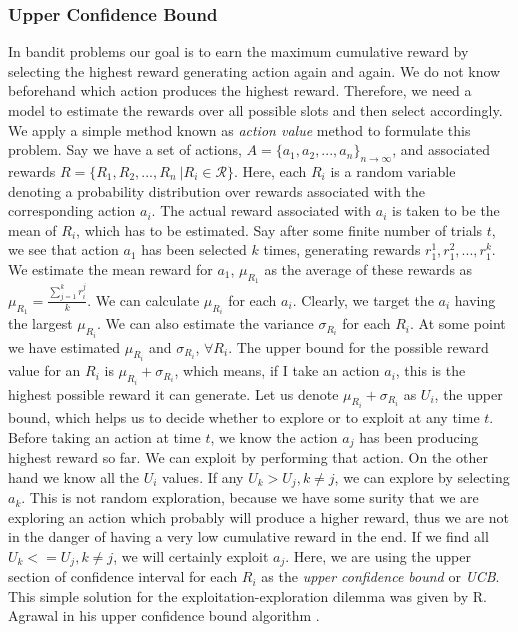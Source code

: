 \documentclass[english]{tktltiki}
\begin{document}
\subsubsection{Upper Confidence Bound}
\label{sec:UCB}
In bandit problems our goal is to earn the maximum cumulative reward by selecting the highest reward generating action again and again. We do not know beforehand which action produces the highest reward. Therefore, we need a model to estimate the rewards over all possible slots and then select accordingly. We apply a simple method known as \textit{action value} method \cite{reinforcement_learning} to formulate this problem. Say we have a set of actions, $A = \{a_1, a_2, ..., a_n\}_{n \to \infty}$, and associated rewards $R = \{R_1, R_2, ..., R_n\ | R_i \in \mathcal{R}\}$. Here, each $R_i$ is a random variable denoting a probability distribution over rewards associated with the corresponding action $a_i$. The actual reward associated with $a_i$ is taken to be the mean of $R_i$, which has to be estimated. Say after some finite number of trials $t$, we see that action $a_1$ has been selected $k$ times, generating rewards $r_1^1, r_1^2, ..., r_1^k$. We estimate the mean reward for $a_1$, $\mu_{R_1}$ as the average of these rewards as $\mu_{R_1} = \frac{\sum_{j = 1}^k{r_i^j}}{k}$. We can calculate $\mu_{R_i}$ for each $a_i$. Clearly, we target the $a_i$ having the largest $\mu_{R_i}$. We can also estimate the variance $\sigma_{R_i}$ for each $R_i$. At some point we have estimated $\mu_{R_i}$ and $\sigma_{R_i}$, $\forall R_i$. The upper bound for the possible reward value for an $R_i$ is $\mu_{R_i} + \sigma_{R_i}$, which means, if I take an action $a_i$, this is the highest possible reward it can generate. Let us denote $\mu_{R_i} + \sigma_{R_i}$ as $U_i$, the upper bound, which helps us to decide whether to explore or to exploit at any time $t$. Before taking an action at time $t$, we know the action $a_j$ has been producing highest reward so far. We can exploit by performing that action. On the other hand we know all the $U_i$ values. If any $U_k > U_j, k \neq j$, we can explore by selecting $a_k$. This is not random exploration, because we have some surity that we are exploring an action which probably will produce a higher reward, thus we are not in the danger of having a very low cumulative reward in the end. If we find all $U_k <= U_j, k \neq j$, we will certainly exploit $a_j$. Here, we are using the upper section of confidence interval for each $R_i$ as the \textit{upper confidence bound} or \textit{UCB}. This simple solution for the exploitation-exploration dilemma was given by R. Agrawal in his upper confidence bound algorithm \cite{ucb}.
\end{document}
